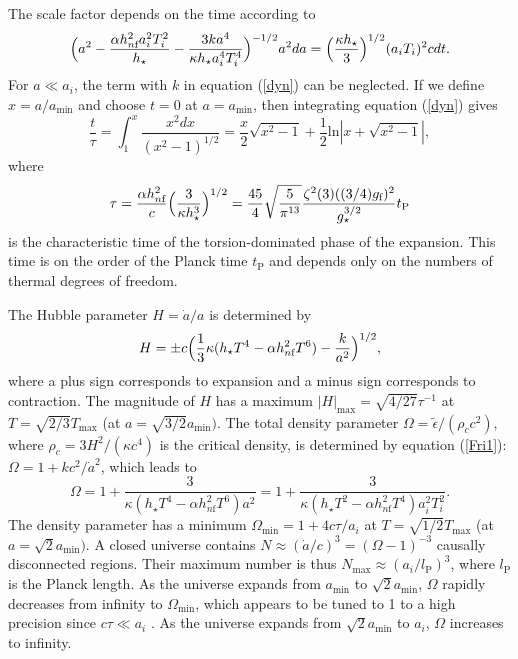 \documentclass[prd,onecolumn,nofootinbib]{revtex4}
\begin{document}
The scale factor depends on the time according to
\begin{equation}
\Bigl(a^2-\frac{\alpha h_{n\textrm{f}}^2 a_i^2 T_i^2}{h_\star}-\frac{3ka^4}{\kappa h_\star a_i^4 T_i^4}\Bigr)^{-1/2}a^2 da=\Bigl(\frac{\kappa h_\star}{3}\Bigr)^{1/2}(a_i T_i)^2 cdt.
\label{dyn}
\end{equation}
For $a\ll a_i$, the term with $k$ in equation (\ref{dyn}) can be neglected.
If we define $x=a/a_\textrm{min}$ and choose $t=0$ at $a=a_\textrm{min}$, then integrating equation (\ref{dyn}) gives \cite{torsion1}
\begin{equation}
\frac{t}{\tau}=\int_1^x\frac{x^2 dx}{(x^2-1)^{1/2}}=\frac{x}{2}\sqrt{x^2-1}+\frac{1}{2}\mbox{ln}|x+\sqrt{x^2-1}|,
\end{equation}
where
\begin{equation}
\tau=\frac{\alpha h_{n\textrm{f}}^2}{c}\Bigl(\frac{3}{\kappa h_\star^3}\Bigr)^{1/2}=\frac{45}{4}\sqrt{\frac{5}{\pi^{13}}}\frac{\zeta^2(3)((3/4)g_\textrm{f})^2}{g_\star^{3/2}}t_\textrm{P}
\end{equation}
is the characteristic time of the torsion-dominated phase of the expansion.
This time is on the order of the Planck time $t_\textrm{P}$ and depends only on the numbers of thermal degrees of freedom.

The Hubble parameter $H=\dot{a}/a$ is determined by
\begin{equation}
H=\pm c\Bigl(\frac{1}{3}\kappa(h_\star T^4-\alpha h_{n\textrm{f}}^2 T^6)-\frac{k}{a^2}\Bigr)^{1/2},
\end{equation}
where a plus sign corresponds to expansion and a minus sign corresponds to contraction.
The magnitude of $H$ has a maximum $|H|_\textrm{max}=\sqrt{4/27}\tau^{-1}$ at $T=\sqrt{2/3}T_\textrm{max}$ (at $a=\sqrt{3/2}a_\textrm{min})$.
The total density parameter $\Omega=\tilde{\epsilon}/(\rho_c c^2)$, where $\rho_c=3H^2/(\kappa c^4)$ is the critical density, is determined by equation (\ref{Fri1}): $\Omega=1+kc^2/\dot{a}^2$, which leads to
\begin{equation}
\Omega=1+\frac{3}{\kappa(h_\star T^4-\alpha h_{n\textrm{f}}^2 T^6)a^2}=1+\frac{3}{\kappa(h_\star T^2-\alpha h_{n\textrm{f}}^2 T^4)a_i^2 T_i^2}.
\label{dens}
\end{equation}
The density parameter has a minimum $\Omega_\textrm{min}=1+4c\tau/a_i$ at $T=\sqrt{1/2}T_\textrm{max}$ (at $a=\sqrt{2}a_\textrm{min})$.
A closed universe contains $N\approx(\dot{a}/c)^3=(\Omega-1)^{-3}$ causally disconnected regions.
Their maximum number is thus $N_\textrm{max}\approx(a_i/l_\textrm{P})^3$, where $l_\textrm{P}$ is the Planck length.
As the universe expands from $a_\textrm{min}$ to $\sqrt{2}a_\textrm{min}$, $\Omega$ rapidly decreases from infinity to $\Omega_\textrm{min}$, which appears to be tuned to 1 to a high precision since $c\tau\ll a_i$ \cite{torsion1}.
As the universe expands from $\sqrt{2}a_\textrm{min}$ to $a_i$, $\Omega$ increases to infinity.
\end{document}
